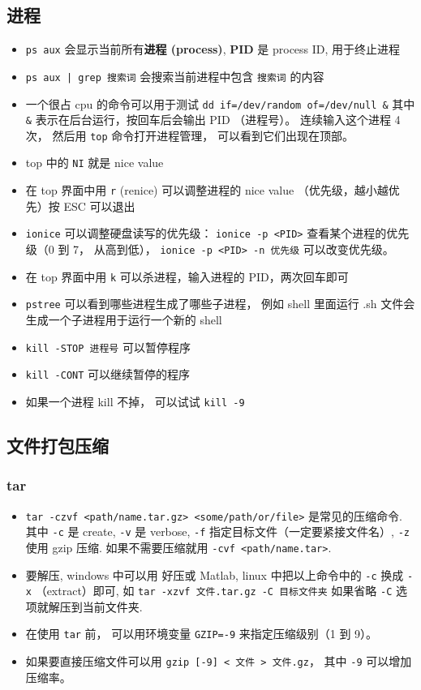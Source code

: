 \subsection{进程}
\begin{itemize}
\item \verb`ps aux` 会显示当前所有\textbf{进程 (process)}, \textbf{PID} 是 process ID, 用于终止进程
\item \verb`ps aux | grep 搜索词` 会搜索当前进程中包含 \verb`搜索词` 的内容
\item 一个很占 cpu 的命令可以用于测试 \verb`dd if=/dev/random of=/dev/null &` 其中 \verb`&` 表示在后台运行，按回车后会输出 PID （进程号）。 连续输入这个进程 4 次， 然后用 \verb`top` 命令打开进程管理， 可以看到它们出现在顶部。
\item top 中的 \verb`NI` 就是 nice value
\item 在 top 界面中用 \verb`r` (renice) 可以调整进程的 nice value （优先级，越小越优先）按 ESC 可以退出
\item \verb|ionice| 可以调整硬盘读写的优先级： \verb|ionice -p <PID>| 查看某个进程的优先级（0 到 7， 从高到低）， \verb|ionice -p <PID> -n 优先级| 可以改变优先级。
\item 在 top 界面中用 \verb`k` 可以杀进程，输入进程的 PID，两次回车即可
\item \verb`pstree` 可以看到哪些进程生成了哪些子进程， 例如 shell 里面运行 .sh 文件会生成一个子进程用于运行一个新的 shell
\item \verb`kill -STOP 进程号` 可以暂停程序
\item \verb`kill -CONT` 可以继续暂停的程序
\item 如果一个进程 kill 不掉， 可以试试 \verb|kill -9|
\end{itemize}

\subsection{文件打包压缩}
\subsubsection{tar}
\begin{itemize}
\item \verb`tar -czvf <path/name.tar.gz> <some/path/or/file>` 是常见的压缩命令. 其中 \verb`-c` 是 create, \verb`-v` 是 verbose, \verb`-f` 指定目标文件（一定要紧接文件名）, \verb`-z` 使用 gzip 压缩. 如果不需要压缩就用 \verb`-cvf <path/name.tar>`.
\item 要解压, windows 中可以用 好压或 Matlab, linux 中把以上命令中的 \verb`-c` 换成 \verb`-x` （extract）即可, 如 \verb`tar -xzvf 文件.tar.gz -C 目标文件夹` 如果省略 \verb`-C` 选项就解压到当前文件夹.
\item 在使用 \verb|tar| 前， 可以用环境变量 \verb|GZIP=-9| 来指定压缩级别（1 到 9）。
\item 如果要直接压缩文件可以用 \verb|gzip [-9] < 文件 > 文件.gz|， 其中 \verb|-9| 可以增加压缩率。
\end{itemize}

